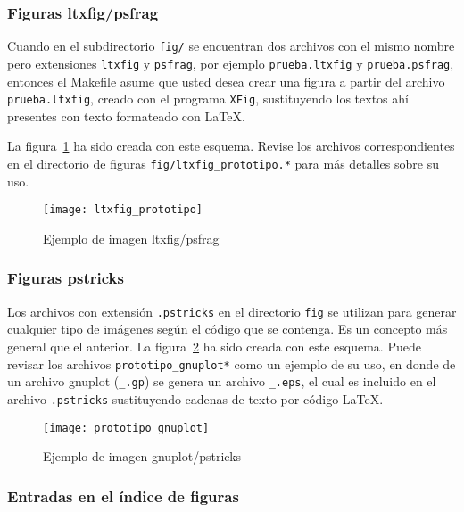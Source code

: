 \subsubsection{Figuras ltxfig/psfrag}

Cuando en el subdirectorio \texttt{fig/} se encuentran dos archivos con el
mismo nombre pero extensiones \texttt{ltxfig} y \texttt{psfrag}, por ejemplo
\texttt{prueba.ltxfig} y \texttt{prueba.psfrag}, entonces el Makefile asume que
usted desea crear una figura a partir del archivo \texttt{prueba.ltxfig},
creado con el programa \texttt{XFig}, sustituyendo los textos ahí presentes con
texto formateado con LaTeX.

La figura~\ref{fig:ltxfig} ha sido creada con este esquema.  Revise los
archivos correspondientes en el directorio de figuras
\texttt{fig/ltxfig\_prototipo.*} para más detalles sobre su uso.

\begin{figure}[htb]
  \centering
  \texttt{[image: ltxfig\_prototipo]}
  \caption{Ejemplo de imagen ltxfig/psfrag}
  \label{fig:ltxfig}
\end{figure}

\subsubsection{Figuras pstricks}  

Los archivos con extensión \texttt{.pstricks} en el directorio \texttt{fig} se
utilizan para generar cualquier tipo de imágenes según el código que se
contenga.  Es un concepto más general que el anterior.  La
figura~\ref{fig:pstricks} ha sido creada con este esquema.  Puede revisar los
archivos \texttt{prototipo\_gnuplot*} como un ejemplo de su uso, en donde de un
archivo gnuplot (\texttt{\_.gp}) se genera un archivo \texttt{\_.eps}, el cual
es incluido en el archivo \texttt{.pstricks} sustituyendo cadenas de texto por
código LaTeX.

\begin{figure}[htb]
  \centering
  \texttt{[image: prototipo\_gnuplot]}
  \caption{Ejemplo de imagen gnuplot/pstricks}
  \label{fig:pstricks}
\end{figure}

\subsubsection{Entradas en el índice de figuras}

